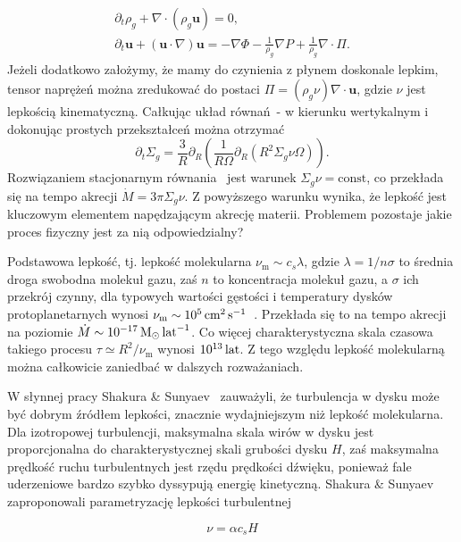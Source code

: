 \begin{gather}
   \partial_t \rho_g + \nabla\cdot\left(\rho_g\mathbf{u}\right) = 0,
   \label{eq:ns1}\\
\partial_t \mathbf{u} + \left(\mathbf{u}\cdot\nabla\right)\mathbf{u} = 
-\nabla\Phi -\frac{1}{\rho_g} \nabla P + \frac{1}{\rho_g} \nabla \cdot \Pi.
\label{eq:ns2}
\end{gather}
Jeżeli dodatkowo założymy, że mamy do czynienia z płynem doskonale lepkim, tensor
naprężeń można zredukować do postaci $\Pi = (\rho_g \nu)\nabla\cdot\mathbf{u}$,
gdzie $\nu$ jest lepkością kinematyczną. Całkując układ
równań~- w kierunku wertykalnym i dokonując prostych
przekształceń można otrzymać
\begin{equation}\label{eq:sigma}
   \partial_t \Sigma_g =
   \frac{3}{R}\partial_R\left(\frac{1}{R\Omega}\partial_R\left(R^2\Sigma_g \nu
         \Omega\right)\right).
\end{equation}
Rozwiązaniem stacjonarnym równania~ jest warunek $\Sigma_g\nu =
\textrm{const}$, co przekłada się na tempo akrecji $\dot{M} = 3\pi\Sigma_g\nu$.
Z powyższego warunku wynika, że lepkość jest kluczowym elementem napędzającym
akrecję materii. Problemem pozostaje jakie proces fizyczny jest za nią
odpowiedzialny?
\par Podstawowa lepkość, tj. lepkość molekularna $\nu_{\textrm{m}} \sim c_s
\lambda$, gdzie $\lambda = 1 / n\sigma$ to średnia droga swobodna molekuł gazu,
zaś $n$ to koncentracja molekuł gazu, a $\sigma$ ich przekrój czynny, dla
typowych wartości gęstości i temperatury dysków protoplanetarnych wynosi
$\nu_{\textrm{m}}\sim10^5\hbox{$\thinspace\textrm{cm}$}^2\hbox{$\thinspace\textrm{s}$}^{-1}$~\cite{armitage}. Przekłada się to na
tempo akrecji na poziomie $\dot{M}\sim 10^{-17}\hbox{$\mathrm{\thinspace M_{\odot}}$}\hbox{$\thinspace\textrm{lat}$}^{-1}$. Co więcej
charakterystyczna skala czasowa takiego procesu $\tau \simeq R^2 /
\nu_{\textrm{m}}$ wynosi $10^{13}\hbox{$\thinspace\textrm{lat}$}$. Z tego względu lepkość molekularną można
całkowicie zaniedbać w dalszych rozważaniach.
\par W słynnej pracy Shakura \& Sunyaev~\citep{SS73} zauważyli, że turbulencja
w dysku może być dobrym źródłem lepkości, znacznie wydajniejszym niż lepkość
molekularna. Dla izotropowej turbulencji, maksymalna skala wirów w dysku jest
proporcjonalna do charakterystycznej skali grubości dysku $H$, zaś maksymalna
prędkość ruchu turbulentnych jest rzędu prędkości dźwięku, ponieważ fale
uderzeniowe bardzo szybko dyssypują energię kinetyczną. Shakura \& Sunyaev
zaproponowali parametryzację lepkości turbulentnej

\begin{equation}\label{eq:alpha}
\nu = \alpha c_s H
\end{equation}

